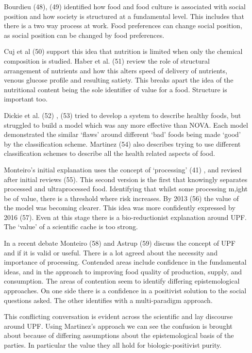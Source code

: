 \documentclass[
]{article}
\begin{document}
Bourdieu (48), (49) identified how food and food culture is associated
with social position and how society is structured at a fundamental
level. This includes that there is a two way process at work. Food
preferences can change social position, as social position can be
changed by food preferences.

Cuj et al (50) support this idea that nutrition is limited when only the
chemical composition is studied. Haber et al. (51) review the role of
structural arrangement of nutrients and how this alters speed of
delivery of nutrients, venous glucose profile and resulting satiety.
This breaks apart the idea of the nutritional content being the sole
identifier of value for a food. Structure is important too.

Dickie et al. (52) , (53) tried to develop a system to describe healthy
foods, but struggled to build a model which was any more effective than
NOVA. Each model demonstrated the similar `flaws' around different `bad'
foods being made `good' by the classification scheme. Martinez (54) also
describes trying to use different classification schemes to describe all
the health related aspects of food.

Monteiro's initial explanation uses the concept of `processing' (41) ,
and revised after initial reviews (55). This second version is the first
that knowingly separates processed and ultraprocessed food. Identifying
that whilst some processing m,ight be of value, there is a threshold
where risk increases. By 2013 (56) the value of the model was becoming
clearer. This idea was more confidently expressed by 2016 (57). Even at
this stage there is a bio-reductionist explanation around UPF. The
`value' of a scientific cache is too strong.

In a recent debate Monteiro (58) and Astrup (59) discuss the concept of
UPF and if it is valid or useful. There is a lot agreed about the
necessity and importance of processing. Contended areas include
confidence in the fundamental ideas, and in the approach to improving
food quality of production, supply, and consumption. The areas of
contention seem to identify differing epistemological approaches. On one
side there is a confidence in a positivist solution to the social
questions asked. The other identifies with a multi-paradigm approach.

This conflicting conversation is evident across the scientific and lay
discourse around UPF. Using Martinez's approach we can see the confusion
is brought about because of differing assumptions about the
epistemological basis of the parties. In particular the value they all
hold for biologic-positivist purity.
\end{document}
